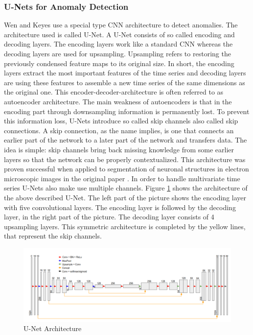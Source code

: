 \subsubsection{U-Nets for Anomaly Detection}
Wen and Keyes \parencite*{Wen2019} use a special type CNN architecture to detect anomalies. The architecture used is called U-Net. A U-Net consists of so called encoding and decoding layers. The encoding layers work like a standard CNN whereas the decoding layers are used for upsampling. Upsampling refers to restoring the previously condensed feature maps to its original size. In short, the encoding layers extract the most important features of the time series and decoding layers are using these features to assemble a new time series of the same dimensions as the original one. This encoder-decoder-architecture is often referred to as autoencoder architecture. The main weakness of autoencoders is that in the encoding part through downsampling information is permanently lost. To prevent this information loss, U-Nets introduce so called skip channels also called skip connections. A skip connection, as the name implies, is one that connects an earlier part of the network to a later part of the network and transfers data. The idea is simple: skip channels bring back missing knowledge from some earlier layers so that the network can be properly contextualized. This architecture was proven successful when applied to segmentation of neuronal structures in electron microscopic images in the original paper \parencite{Cicek2016}. In order to handle multivariate time series U-Nets also make use multiple channels. Figure \ref{fig:U-Net} shows the architecture of the above described U-Net. The left part of the picture shows the encoding layer with five convolutional layers. The encoding layer is followed by the decoding layer, in the right part of the picture. The decoding layer consists of 4 upsampling layers. This symmetric architecture is completed by the yellow lines, that represent the skip channels.

\begin{figure}[h]
	\centering
	\includegraphics[scale=0.32]{Figures/U-Net}
	\decoRule
	\caption[U-Net Architecture]{U-Net Architecture \parencite{Wen2019}}
	\label{fig:U-Net}
\end{figure}


